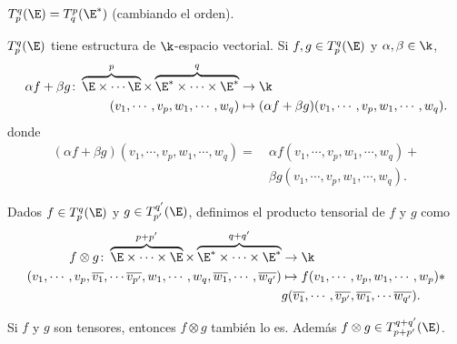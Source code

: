 \begin{prop}
    $ T_p^q(\E) = T_q^p(\E^*) $ (cambiando el orden).
\end{prop}
\begin{prop}
    $ T_p^q(\E) $ tiene estructura de $ \k $-espacio vectorial.  Si $ f,
    g \in T_p^q(\E) $ y $ \alpha , \beta \in \k $,
    \[
        \begin{aligned}
            \alpha f + \beta g \colon \overbrace{\E \times \cdots \E}^p
            \times \overbrace{\E^* \times \cdots \times \E^*}^q &\to \k
            \\
            (v_1, \cdots, v_p, w_1, \cdots, w_q) &\mapsto (\alpha f +
            \beta g) (v_1, \cdots, v_p, w_1, \cdots, w_q).
        \end{aligned}
    \]
    donde
    \[
        \begin{aligned}
            (\alpha f + \beta g) (v_1, \cdots, v_p, w_1, \cdots, w_q) = \
            &\alpha f(v_1, \cdots, v_p, w_1, \cdots, w_q) + \\
            &\beta g(v_1, \cdots, v_p, w_1, \cdots, w_q).
        \end{aligned}
    \]
\end{prop}
\begin{defi}
    Dados $ f \in T_p^q(\E) $ y $ g \in T_{p'}^{q'}(\E) $, definimos el
    producto tensorial de $ f $ y $ g $ como
    \[
        \begin{aligned}
            f \otimes g \colon \overbrace{\E \times \cdots \times \E}^{p+p'}
            \times \overbrace{\E^* \times \cdots \times \E^*}^{q+q'} &\to
            \k \\
            (v_1, \cdots, v_p, \overline{v_1}, \cdots \overline{v_{p'}},
            w_1, \cdots, w_q, \overline{w_1}, \cdots, \overline{w_{q'}})
            &\mapsto f(v_1, \cdots, v_p, w_1, \cdots, w_p) * \\
            &g(\overline{v_1}, \cdots, \overline{v_{p'}}, \overline{w_1},
            \cdots \overline{w_{q'}}).
        \end{aligned}
    \]
\end{defi}
\begin{obs}
    Si $ f $ y $ g $ son tensores, entonces $ f \otimes g $ también lo
    es.  Además $ f \otimes g \in T_{p+p'}^{q+q'}(\E) $.
\end{obs}
